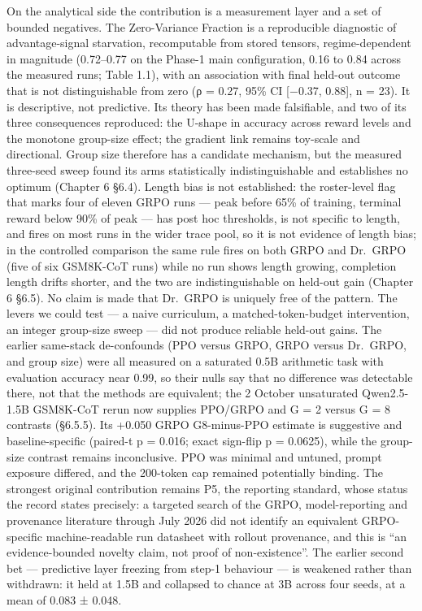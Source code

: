 \documentclass[12pt,a4paper]{report}
\begin{document}
On the analytical side the contribution is a measurement layer and a set
of bounded negatives. The Zero-Variance Fraction is a reproducible
diagnostic of advantage-signal starvation, recomputable from stored
tensors, regime-dependent in magnitude (0.72--0.77 on the Phase-1 main
configuration, 0.16 to 0.84 across the measured runs; Table 1.1), with
an association with final held-out outcome that is not distinguishable
from zero (ρ = 0.27, 95\% CI {[}−0.37, 0.88{]}, n = 23). It is
descriptive, not predictive. Its theory has been made falsifiable, and
two of its three consequences reproduced: the U-shape in accuracy across
reward levels and the monotone group-size effect; the gradient link
remains toy-scale and directional. Group size therefore has a candidate
mechanism, but the measured three-seed sweep found its arms
statistically indistinguishable and establishes no optimum (Chapter 6
§6.4). Length bias is not established: the roster-level flag that marks
four of eleven GRPO runs --- peak before 65\% of training, terminal
reward below 90\% of peak --- has post hoc thresholds, is not specific
to length, and fires on most runs in the wider trace pool, so it is not
evidence of length bias; in the controlled comparison the same rule
fires on both GRPO and Dr.~GRPO (five of six GSM8K-CoT runs) while no
run shows length growing, completion length drifts shorter, and the two
are indistinguishable on held-out gain (Chapter 6 §6.5). No claim is
made that Dr.~GRPO is uniquely free of the pattern. The levers we could
test --- a naive curriculum, a matched-token-budget intervention, an
integer group-size sweep --- did not produce reliable held-out gains.
The earlier same-stack de-confounds (PPO versus GRPO, GRPO versus
Dr.~GRPO, and group size) were all measured on a saturated 0.5B
arithmetic task with evaluation accuracy near 0.99, so their nulls say
that no difference was detectable there, not that the methods are
equivalent; the 2 October unsaturated Qwen2.5-1.5B GSM8K-CoT rerun now
supplies PPO/GRPO and G = 2 versus G = 8 contrasts (§6.5.5). Its +0.050
GRPO G8-minus-PPO estimate is suggestive and baseline-specific (paired-t
p = 0.016; exact sign-flip p = 0.0625), while the group-size contrast
remains inconclusive. PPO was minimal and untuned, prompt exposure
differed, and the 200-token cap remained potentially binding. The
strongest original contribution remains P5, the reporting standard,
whose status the record states precisely: a targeted search of the GRPO,
model-reporting and provenance literature through July 2026 did not
identify an equivalent GRPO-specific machine-readable run datasheet with
rollout provenance, and this is ``an evidence-bounded novelty claim, not
proof of non-existence''. The earlier second bet --- predictive layer
freezing from step-1 behaviour --- is weakened rather than withdrawn: it
held at 1.5B and collapsed to chance at 3B across four seeds, at a mean
of 0.083 ± 0.048.
\end{document}
